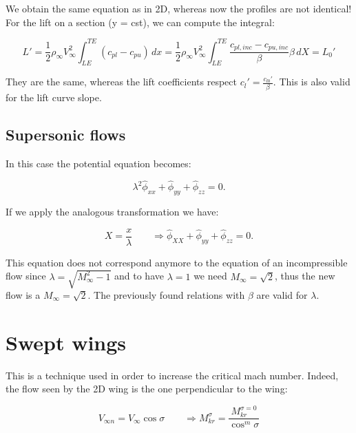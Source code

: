 	We obtain the same equation as in 2D, whereas now the profiles are not identical! For the lift on a section (y = cst), we can compute the integral:
	
	\begin{equation}
	L' = \frac{1}{2} \rho _\infty V_\infty ^2\int _{LE} ^{TE} (c_{pl} - c_{pu})\, dx
= \frac{1}{2} \rho _\infty V_\infty ^2\int _{LE} ^{TE} \frac{c_{pl,inc} - c_{pu,inc}}{\beta} \beta\, dX = L_0'
	\end{equation}
	
	They are the same, whereas the lift coefficients respect $c_l' = \frac{c_{l0}'}{\beta}$. This is also valid for the lift curve slope. 
	
\subsection{Supersonic flows}
	In this case the potential equation becomes:
	
	\begin{equation}
	\lambda ^2 \hat{\phi} _{xx} + \hat{\phi} _{yy} + \hat{\phi} _{zz} = 0.
	\end{equation}
	
	If we apply the analogous transformation we have:
	
	\begin{equation}
	X = \frac{x}{\lambda} \qquad \Rightarrow  \hat{\phi} _{XX} + \hat{\phi} _{yy} + \hat{\phi} _{zz} = 0.
	\end{equation}
	
	This equation does not correspond anymore to the equation of an incompressible flow since $\lambda = \sqrt{M_\infty ^2 - 1}$ and to have $\lambda = 1$ we need $M_\infty = \sqrt{2}$, thus the new flow is a $M_\infty = \sqrt{2}$. The previously found relations with $\beta$ are valid for $\lambda$. 
	
\section{Swept wings}
	This is a technique used in order to increase the critical mach number. Indeed, the flow seen by the 2D wing is the one perpendicular to the wing:
	
	\begin{equation}
	V_{\infty n} = V_{\infty}\cos \sigma \qquad \Rightarrow M_{kr}^\sigma= \frac{M_{kr}^{\sigma = 0}}{\cos^m \sigma}
	\end{equation}
	
